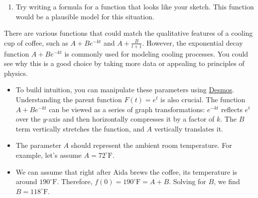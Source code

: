 \documentclass[10pt]{article}
\begin{document}
\begin{enumerate}[leftmargin=*]
\begin{enumerate}
\begin{solution}

So we see that our cooling function is decreasing and concave up.
\end{solution}
        \item
        \begin{problem}[\vfill \newpage]
            Try writing a formula for a function that looks like your sketch.
            This function would be a plausible model for this situation.
        \end{problem}
    \end{enumerate}




\begin{solution}
There are various functions that could match the qualitative features of a cooling cup of coffee, such as \( A + B e^{-kt} \) and \( A + \frac{B}{t + 1} \). However, the exponential decay function \( A + B e^{-kt} \) is commonly used for modeling cooling processes. You could see why this is a good choice by taking more data or  appealing to principles of physics.
\begin{itemize}
\item To build intuition, you can manipulate these parameters using \href{https://www.desmos.com/calculator/tdh4ybzztn}{Desmos}. Understanding the parent function \( F(t) = e^t \) is also crucial. The function \( A + B e^{-kt} \) can be viewed as a series of graph transformations: \( e^{-kt} \) reflects \( e^t \) over the \( y \)-axis and then horizontally compresses it by a factor of \( k \). The \( B \) term vertically stretches the function, and \( A \) vertically translates it.

\item The parameter \( A \) should represent the ambient room temperature. For example, let's assume \( A = 72^\circ \text{F} \).

\item We can assume that right after Aida brews the coffee, its temperature is around $190^\circ \text{F}$. Therefore, \( f(0) = 190^\circ \text{F} = A + B \). Solving for \( B \), we find \( B = 118^\circ \text{F} \).


\end{itemize}
\end{solution}
\end{enumerate}
\end{document}
